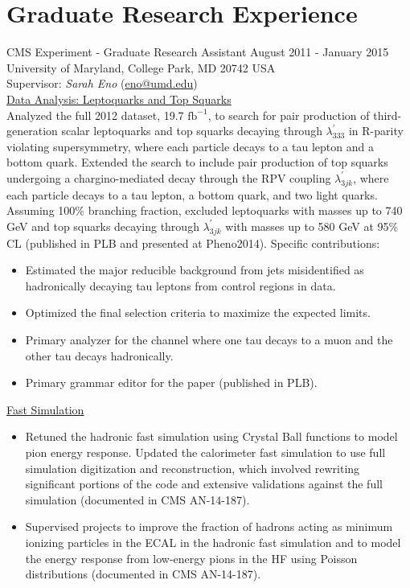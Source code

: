 \setlength{\parskip}{0pt}
\section{Graduate Research Experience}
CMS Experiment - Graduate Research Assistant \hfill August 2011 - January 2015\\
University of Maryland, College Park, MD 20742 USA\\
Supervisor: {\sl Sarah Eno} (\href{mailto:eno@umd.edu}{eno@umd.edu})\\
\underline{Data Analysis: Leptoquarks and Top Squarks}\\
Analyzed the full 2012 dataset, 19.7 $\text{fb}^{-1}$, to search for pair production of third-generation scalar leptoquarks and top squarks decaying through $\lambda^{\prime}_{333}$ in R-parity violating supersymmetry, where each particle decays to a tau lepton and a bottom quark. Extended the search to include pair production of top squarks undergoing a chargino-mediated decay through the RPV coupling $\lambda^{\prime}_{3jk}$, where each particle decays to a tau lepton, a bottom quark, and two light quarks. Assuming 100\% branching fraction, excluded leptoquarks with masses up to 740 GeV and top squarks decaying through $\lambda^{\prime}_{3jk}$ with masses up to 580 GeV at 95\% CL (published in PLB and presented at Pheno2014). Specific contributions:
\begin{itemize}[leftmargin=12pt]
\item Estimated the major reducible background from jets misidentified as hadronically decaying tau leptons from control regions in data.
\item Optimized the final selection criteria to maximize the expected limits.
\item Primary analyzer for the channel where one tau decays to a muon and the other tau decays hadronically.
\item Primary grammar editor for the paper (published in PLB).
\end{itemize}
\underline{Fast Simulation}
\begin{itemize}[leftmargin=12pt]
\item Retuned the hadronic fast simulation using Crystal Ball functions to model pion energy response. Updated the calorimeter fast simulation to use full simulation digitization and reconstruction, which involved rewriting significant portions of the code and extensive validations against the full simulation (documented in CMS AN-14-187).
\item Supervised projects to improve the fraction of hadrons acting as minimum ionizing particles in the ECAL in the hadronic fast simulation and to model the energy response from low-energy pions in the HF using Poisson distributions (documented in CMS AN-14-187).
\end{itemize}
